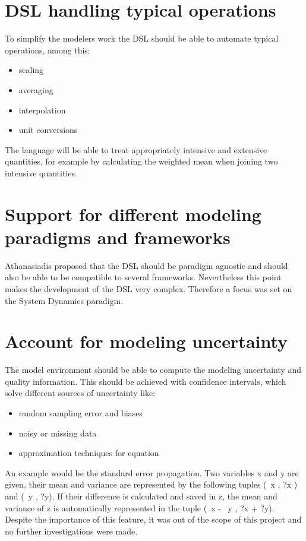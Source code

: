 \section{DSL handling typical operations}

To simplify the modelers work the DSL should be able to automate typical operations, among this:

\begin{itemize}
	\item scaling
	\item averaging
	\item interpolation
	\item unit conversions
\end{itemize}

The language will be able to treat appropriately intensive and extensive quantities, for example by calculating the weighted mean when joining two intensive quantities.

\section{Support for different modeling paradigms and frameworks}

Athanasiadis proposed that the DSL should be paradigm agnostic and should also be able to be compatible to several frameworks. Nevertheless this point makes the development of the DSL very complex. Therefore a focus was set on the System Dynamics paradigm.

\section{Account for modeling uncertainty}

The model environment should be able to compute the modeling uncertainty and quality information. This should be achieved with confidence intervals, which solve different sources of uncertainty like:

\begin{itemize}
	\item random sampling error and biases
	\item noisy or missing data
	\item approximation techniques for equation
\end{itemize}

An example would be the standard error propagation. Two variables x and y are given, their mean and variance are represented by the following tuples (\textmu~x , ?x ) and (\textmu~y , ?y). If their difference is calculated and saved in z, the mean and variance of z is automatically represented in the tuple  (\textmu~x - \textmu~y , ?x + ?y).
Despite the importance of this feature, it was out of the scope of this project and no further investigations were made.


